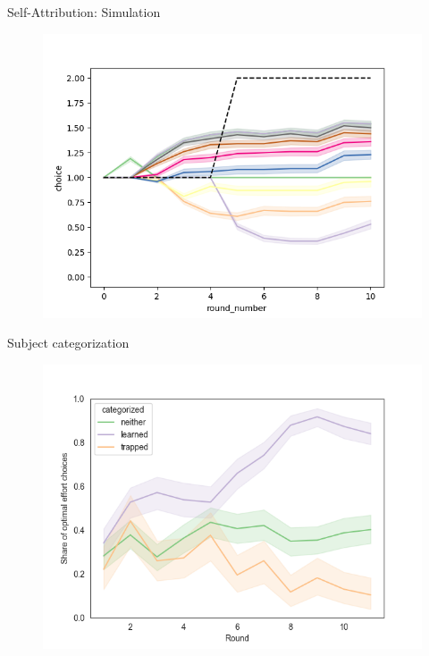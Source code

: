 \documentclass[aspectratio=169]{beamer}
\begin{document}
\begin{frame}{Self-Attribution: Simulation}
    \begin{figure}
        \centering
        \includegraphics[scale=.5]{self-serving_11.png}
    
    \end{figure}
    \label{ss}

\end{frame}


\begin{frame}{Subject categorization}
    \begin{figure}
        \centering
        \includegraphics[scale=.5]{categorized.png}
    \end{figure}
    \label{categories}
    
\end{frame}
\end{document}
